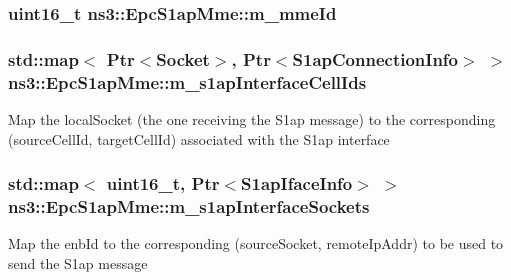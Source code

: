 \subsubsection[{\texorpdfstring{m\+\_\+mme\+Id}{m_mmeId}}]{\setlength{\rightskip}{0pt plus 5cm}uint16\+\_\+t ns3\+::\+Epc\+S1ap\+Mme\+::m\+\_\+mme\+Id\hspace{0.3cm}{\ttfamily [private]}}\hypertarget{classns3_1_1EpcS1apMme_aec351eb8823abfff5cd257d1d47769f1}{}\label{classns3_1_1EpcS1apMme_aec351eb8823abfff5cd257d1d47769f1}
\subsubsection[{\texorpdfstring{m\+\_\+s1ap\+Interface\+Cell\+Ids}{m_s1apInterfaceCellIds}}]{\setlength{\rightskip}{0pt plus 5cm}std\+::map$<$ {\bf Ptr}$<${\bf Socket}$>$, {\bf Ptr}$<${\bf S1ap\+Connection\+Info}$>$ $>$ ns3\+::\+Epc\+S1ap\+Mme\+::m\+\_\+s1ap\+Interface\+Cell\+Ids\hspace{0.3cm}{\ttfamily [private]}}\hypertarget{classns3_1_1EpcS1apMme_a99a04332eff0f80beb198bba9612871d}{}\label{classns3_1_1EpcS1apMme_a99a04332eff0f80beb198bba9612871d}
Map the local\+Socket (the one receiving the S1ap message) to the corresponding (source\+Cell\+Id, target\+Cell\+Id) associated with the S1ap interface 
\subsubsection[{\texorpdfstring{m\+\_\+s1ap\+Interface\+Sockets}{m_s1apInterfaceSockets}}]{\setlength{\rightskip}{0pt plus 5cm}std\+::map$<$ uint16\+\_\+t, {\bf Ptr}$<${\bf S1ap\+Iface\+Info}$>$ $>$ ns3\+::\+Epc\+S1ap\+Mme\+::m\+\_\+s1ap\+Interface\+Sockets\hspace{0.3cm}{\ttfamily [private]}}\hypertarget{classns3_1_1EpcS1apMme_a415a57f1b3b88750ecf99e6bf3187476}{}\label{classns3_1_1EpcS1apMme_a415a57f1b3b88750ecf99e6bf3187476}
Map the enb\+Id to the corresponding (source\+Socket, remote\+Ip\+Addr) to be used to send the S1ap message 
